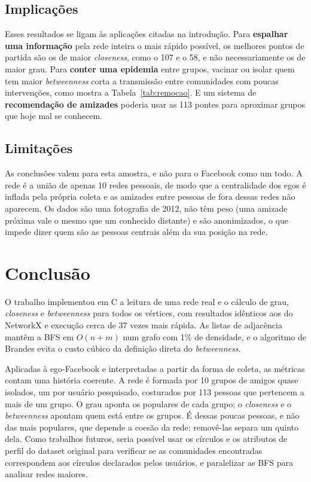 \documentclass[conference]{IEEEtran}
\begin{document}
\subsection{Implicações}

Esses resultados se ligam às aplicações citadas na introdução. Para \textbf{espalhar uma informação} pela rede inteira o mais rápido possível, os melhores pontos de partida são os de maior \textit{closeness}, como o 107 e o 58, e não necessariamente os de maior grau. Para \textbf{conter uma epidemia} entre grupos, vacinar ou isolar quem tem maior \textit{betweenness} corta a transmissão entre comunidades com poucas intervenções, como mostra a Tabela~\ref{tab:remocao}. E um sistema de \textbf{recomendação de amizades} poderia usar as 113 pontes para aproximar grupos que hoje mal se conhecem.

\subsection{Limitações}

As conclusões valem para esta amostra, e não para o Facebook como um todo. A rede é a união de apenas 10 redes pessoais, de modo que a centralidade dos egos é inflada pela própria coleta e as amizades entre pessoas de fora dessas redes não aparecem. Os dados são uma fotografia de 2012, não têm peso (uma amizade próxima vale o mesmo que um conhecido distante) e são anonimizados, o que impede dizer quem são as pessoas centrais além da sua posição na rede.

\section{Conclusão}

O trabalho implementou em C a leitura de uma rede real e o cálculo de grau, \textit{closeness} e \textit{betweenness} para todos os vértices, com resultados idênticos aos do NetworkX e execução cerca de 37 vezes mais rápida. As listas de adjacência mantêm a BFS em $O(n+m)$ num grafo com 1\% de densidade, e o algoritmo de Brandes evita o custo cúbico da definição direta do \textit{betweenness}.

Aplicadas à ego-Facebook e interpretadas a partir da forma de coleta, as métricas contam uma história coerente. A rede é formada por 10 grupos de amigos quase isolados, um por usuário pesquisado, costurados por 113 pessoas que pertencem a mais de um grupo. O grau aponta os populares de cada grupo; o \textit{closeness} e o \textit{betweenness} apontam quem está entre os grupos. É dessas poucas pessoas, e não das mais populares, que depende a coesão da rede: removê-las separa um quinto dela. Como trabalhos futuros, seria possível usar os círculos e os atributos de perfil do dataset original para verificar se as comunidades encontradas correspondem aos círculos declarados pelos usuários, e paralelizar as BFS para analisar redes maiores.
\end{document}
